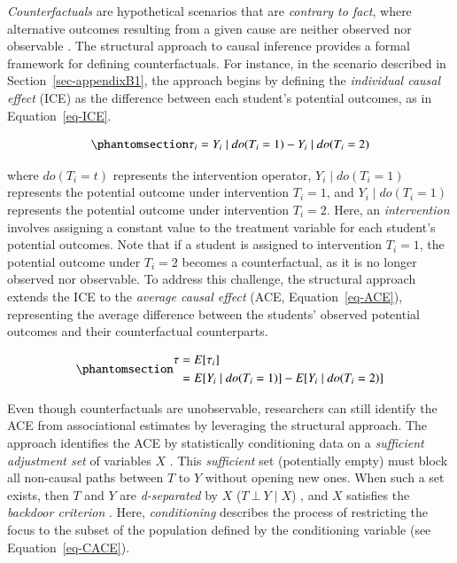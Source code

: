 \documentclass[
  authoryear,
  review,
  1p]{elsarticle}
\begin{document}
\emph{Counterfactuals} are hypothetical scenarios that are
\emph{contrary to fact}, where alternative outcomes resulting from a
given cause are neither observed nor observable
\citep{Neal_2020, Counterfactual_2024}. The structural approach to
causal inference \citep{Pearl_2009, Pearl_et_al_2016} provides a formal
framework for defining counterfactuals. For instance, in the scenario
described in Section~\ref{sec-appendixB1}, the approach begins by
defining the \emph{individual causal effect} (ICE) as the difference
between each student's potential outcomes, as in Equation~\ref{eq-ICE}.

\begin{equation}\phantomsection\label{eq-ICE}{
\tau_{i} = Y_{i} \mid do(T_{i}=1) - Y_{i} \mid do(T_{i}=2)
}\end{equation}

where \(do(T_{i}=t)\) represents the intervention operator,
\(Y_{i} \mid do(T_{i}=1)\) represents the potential outcome under
intervention \(T_{i}=1\), and \(Y_{i} \mid do(T_{i}=1)\) represents the
potential outcome under intervention \(T_{i}=2\). Here, an
\emph{intervention} involves assigning a constant value to the treatment
variable for each student's potential outcomes. Note that if a student
is assigned to intervention \(T_{i}=1\), the potential outcome under
\(T_{i}=2\) becomes a counterfactual, as it is no longer observed nor
observable. To address this challenge, the structural approach extends
the ICE to the \emph{average causal effect} (ACE,
Equation~\ref{eq-ACE}), representing the average difference between the
students' observed potential outcomes and their counterfactual
counterparts.

\begin{equation}\phantomsection\label{eq-ACE}{
\begin{aligned}
\tau & = E[\tau_{i}] \\
  & = E[Y_{i} \mid do(T_{i}=1)]- E[Y_{i} \mid do(T_{i}=2)]
\end{aligned}
}\end{equation}

Even though counterfactuals are unobservable, researchers can still
identify the ACE from associational estimates by leveraging the
structural approach. The approach identifies the ACE by statistically
conditioning data on a \emph{sufficient adjustment set} of variables
\(X\) \citep{Pearl_2009, Pearl_et_al_2016, Morgan_et_al_2014}. This
\emph{sufficient} set (potentially empty) must block all non-causal
paths between \(T\) to \(Y\) without opening new ones. When such a set
exists, then \(T\) and \(Y\) are \emph{d-separated} by \(X\)
(\(T \:\bot\:Y \mid X\)) \citep{Pearl_2009}, and \(X\) satisfies the
\emph{backdoor criterion} \citep[pp 37]{Neal_2020}. Here,
\emph{conditioning} describes the process of restricting the focus to
the subset of the population defined by the conditioning variable
\citep[pp.~32]{Neal_2020} (see Equation~\ref{eq-CACE}).
\end{document}

